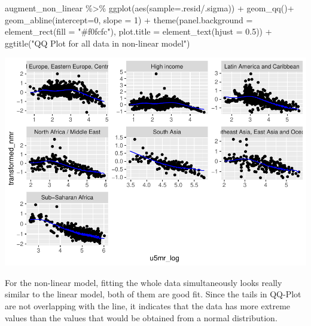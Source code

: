 \documentclass[
]{article}
\newenvironment{Shaded}{\begin{snugshade}}{\end{snugshade}}
\newcommand{\AttributeTok}[1]{\textcolor[rgb]{0.77,0.63,0.00}{#1}}
\newcommand{\DecValTok}[1]{\textcolor[rgb]{0.00,0.00,0.81}{#1}}
\newcommand{\FloatTok}[1]{\textcolor[rgb]{0.00,0.00,0.81}{#1}}
\newcommand{\FunctionTok}[1]{\textcolor[rgb]{0.00,0.00,0.00}{#1}}
\newcommand{\NormalTok}[1]{#1}
\newcommand{\SpecialCharTok}[1]{\textcolor[rgb]{0.00,0.00,0.00}{#1}}
\newcommand{\StringTok}[1]{\textcolor[rgb]{0.31,0.60,0.02}{#1}}
\begin{document}
\begin{Shaded}
\begin{Highlighting}[]
\NormalTok{augment\_non\_linear }\SpecialCharTok{\%\textgreater{}\%} 
  \FunctionTok{ggplot}\NormalTok{(}\FunctionTok{aes}\NormalTok{(}\AttributeTok{sample=}\NormalTok{.resid}\SpecialCharTok{/}\NormalTok{.sigma)) }\SpecialCharTok{+}
  \FunctionTok{geom\_qq}\NormalTok{()}\SpecialCharTok{+}
  \FunctionTok{geom\_abline}\NormalTok{(}\AttributeTok{intercept=}\DecValTok{0}\NormalTok{, }\AttributeTok{slope =} \DecValTok{1}\NormalTok{) }\SpecialCharTok{+}
  \FunctionTok{theme}\NormalTok{(}\AttributeTok{panel.background =} \FunctionTok{element\_rect}\NormalTok{(}\AttributeTok{fill =} \StringTok{"\#f0fcfc"}\NormalTok{),}
        \AttributeTok{plot.title =} \FunctionTok{element\_text}\NormalTok{(}\AttributeTok{hjust =} \FloatTok{0.5}\NormalTok{)) }\SpecialCharTok{+}
  \FunctionTok{ggtitle}\NormalTok{(}\StringTok{"QQ Plot for all data in non{-}linear model"}\NormalTok{)}
\end{Highlighting}
\end{Shaded}

\includegraphics{A2_files/figure-latex/unnamed-chunk-17-2.pdf}

For the non-linear model, fitting the whole data simultaneously looks
really similar to the linear model, both of them are good fit. Since the
tails in QQ-Plot are not overlapping with the line, it indicates that
the data has more extreme values than the values that would be obtained
from a normal distribution.
\end{document}
